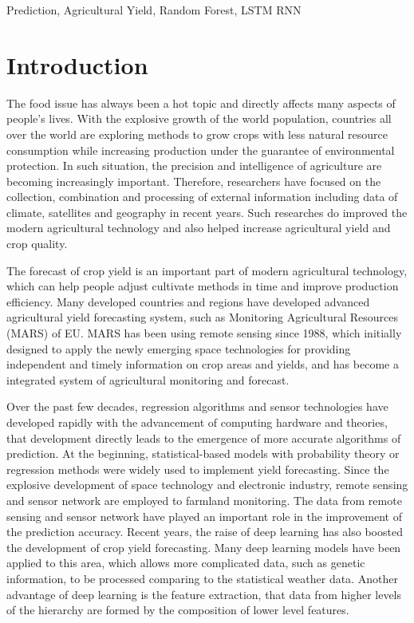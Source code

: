 \documentclass[conference, a4paper]{IEEEtran}
\begin{document}
\begin{IEEEkeywords}
  Prediction, Agricultural Yield, Random Forest, LSTM RNN
\end{IEEEkeywords}

\section{Introduction}
  The food issue has always been a hot topic and directly affects many aspects of people's lives. With the explosive growth of the world population, countries all over the world are exploring methods to grow crops with less natural resource consumption while increasing production under the guarantee of environmental protection. In such situation, the precision and intelligence of agriculture are becoming increasingly important. Therefore, researchers have focused on the collection, combination and processing of external information including data of climate, satellites and geography in recent years. Such researches do improved the modern agricultural technology and also helped increase agricultural yield and crop quality.\par
  The forecast of crop yield is an important part of modern agricultural technology, which can help people adjust cultivate methods in time and improve production efficiency. Many developed countries and regions have developed advanced agricultural yield forecasting system, such as Monitoring Agricultural Resources (MARS) of EU\cite{vanderveldePerformanceMARScropYield2019}. MARS has been using remote sensing since 1988, which initially designed to apply the newly emerging space technologies for providing independent and timely information on crop areas and yields, and has become a integrated system of agricultural monitoring and forecast.\par
  Over the past few decades, regression algorithms and sensor technologies have developed rapidly with the advancement of computing hardware and theories, that development directly leads to the emergence of more accurate algorithms of prediction. At the beginning, statistical-based models with probability theory or regression methods were widely used to implement yield forecasting\cite{matisMarkovChainApproach1985, stephensCropYieldForecasting1995}. Since the explosive development of space technology and electronic industry, remote sensing and sensor network are employed to farmland monitoring.  The data from remote sensing and sensor network have played an important role in the improvement of the prediction accuracy\cite{youDeepGaussianProcess2017, baruthUseRemoteSensing}. Recent years, the raise of deep learning has also boosted the development of crop yield forecasting. Many deep learning models have been applied to this area, which allows more complicated data, such as genetic information, to be processed comparing to the statistical weather data\cite{mateo-sanchisSynergisticIntegrationOptical2019,steenUsingDeepLearning2016a}. Another advantage of deep learning is the feature extraction, that data from higher levels of the hierarchy are formed by the composition of lower level features\cite{lecunDeepLearning2015}.\par
\end{document}
